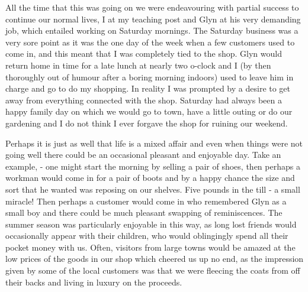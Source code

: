 All the time that this was going on we were endeavouring with partial success to continue our normal lives, I at my teaching post and Glyn at his very demanding job, which entailed working on Saturday mornings. The Saturday business was a very sore point as it was the one day of the week when a few customers used to come in, and this meant that I was completely tied to the shop. Glyn would return home in time for a late lunch at nearly two o-clock and I (by then thoroughly out of humour after a boring morning indoors) used to leave him in charge and go to do my shopping. In reality I was prompted by a desire to get away from everything connected with the shop. Saturday had always been a happy family day on which we would go to town, have a little outing or do our gardening and I do not think I ever forgave the shop for ruining our weekend.

Perhaps it is just as well that life is a mixed affair and even when things were not going well there could be an occasional pleasant and enjoyable day. Take an example, - one might start the morning by selling a pair of shoes, then perhaps a workman would come in for a pair of boots and by a happy chance the size and sort that he wanted was reposing on our shelves. Five pounds in the till - a small miracle! Then perhaps a customer would come in who remembered Glyn as a small boy and there could be much pleasant swapping of reminiscences. The summer season was particularly enjoyable in this way, as long lost friends would occasionally appear with their children, who would oblingingly spend all their pocket money with us. Often, visitors from large towns would be amazed at the low prices of the goods in our shop which cheered us up no end, as the impression given by some of the local customers was that we were fleecing the coats from off their backs and living in luxury on the proceeds.

